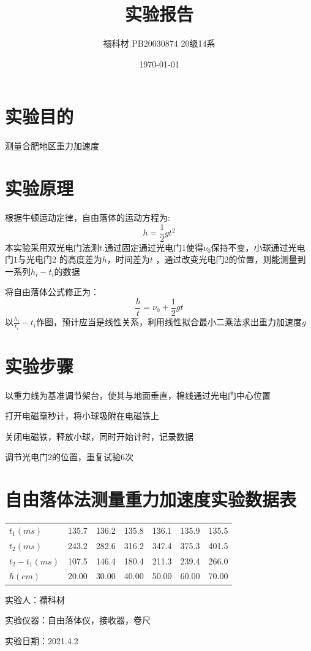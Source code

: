 \documentclass[UTF8]{ctexart}
\title{实验报告}
\author{禤科材 PB20030874 20级14系}
\date{\today}
\begin{document}
    \maketitle
    \section{实验目的}
    测量合肥地区重力加速度

    \section{实验原理}
    根据牛顿运动定律，自由落体的运动方程为:\cite{jiangyi}
    \begin{equation}
        h=\frac{1}{2}gt^2
    \end{equation}
    本实验采用双光电门法测$t$.通过固定通过光电门$1$使得$\nu_0$保持不变，小球通过光电门$1$与光电门$2$
    的高度差为$h$，时间差为$t$ ，通过改变光电门$2$的位置，则能测量到一系列$h_i-t_i$的数据

    将自由落体公式修正为：\cite{jiangyi}
    \begin{equation}
        \frac{h}{t}=\nu_0+\frac 12 gt
    \end{equation}
    以$\frac{h_i}{t_i}-t_i$作图，预计应当是线性关系，利用线性拟合最小二乘法求出重力加速度$g$

    \section{实验步骤}
    以重力线为基准调节架台，使其与地面垂直，棉线通过光电门中心位置

    打开电磁毫秒计，将小球吸附在电磁铁上

    关闭电磁铁，释放小球，同时开始计时，记录数据

    调节光电门$2$的位置，重复试验6次


    \section{自由落体法测量重力加速度实验数据表}

    
    \begin{center}
        
        \begin{tabular}{lllllll}
            $t_1(ms)$       & 135.7 & 136.2 & 135.8 & 136.1 & 135.9 & 135.5 \\
            $t_2(ms)$       & 243.2 & 282.6 & 316.2 & 347.4 & 375.3 & 401.5 \\
            $t_2-t_1(ms)$   & 107.5 & 146.4 & 180.4 & 211.3 & 239.4 & 266.0 \\
            $h(cm)$         & 20.00 & 30.00 & 40.00 & 50.00 & 60.00 & 70.00 \\
            \hline
        \end{tabular}
        
    实验人：禤科材

    实验仪器：自由落体仪，接收器，卷尺

    实验日期：2021.4.2

    \end{center}
    
\end{document}
